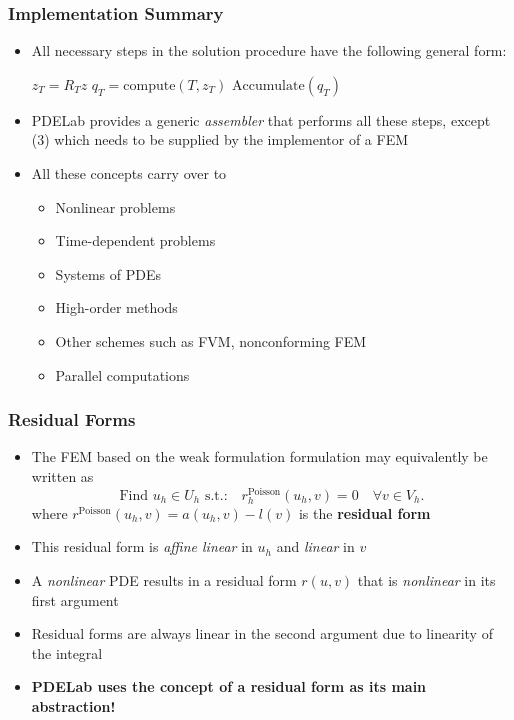 \documentclass[aspectratio=169,11pt]{beamer}
\theoremstyle{definition}
\begin{document}
\begin{frame}
\frametitle{Implementation Summary}
\begin{itemize}
\item All necessary steps in the solution procedure have the following general form:
\begin{algorithmic}[1]
 
\State $z_T = R_T z$ 
\State $q_T=\text{compute}(T,z_T)$ 
\State $\text{Accumulate}(q_T)$ 
\EndFor
\end{algorithmic}
\item PDELab provides a generic {\em assembler} that performs all these steps,
except (3) which needs to be supplied by the implementor of a FEM
\item All these concepts carry over to
\begin{itemize}
\item Nonlinear problems
\item Time-dependent problems
\item Systems of PDEs
\item High-order methods
\item Other schemes such as FVM, nonconforming FEM
\item Parallel computations
\end{itemize}
\end{itemize}
\end{frame}

\begin{frame}
\frametitle{Residual Forms}
\begin{itemize}
\item The FEM based on the weak formulation formulation may equivalently
be written as
\begin{equation*}
\text{Find $u_h\in U_h$ s.t.:} \quad r_h^\text{Poisson}(u_h,v)=0 \quad \forall v\in V_h.
\end{equation*}
where $r^\text{Poisson}(u_h,v) = a(u_h,v) - l(v)$ is the \textbf{residual form}
\item This residual form is {\em affine linear} in $u_h$ and {\em linear} in $v$
\item A {\em nonlinear} PDE results in a residual form $r(u,v)$ that is {\em nonlinear}
in its first argument
\item Residual forms are always linear in the second argument due
to linearity of the integral
\item \textbf{PDELab uses the concept of a residual form as its main abstraction!}
\end{itemize}
\end{frame}
\end{document}
